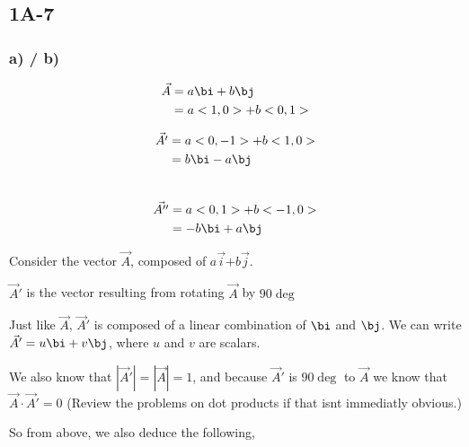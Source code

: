 \subsection*{1A-7}


\subsubsection*{a) / b)}

\begin{align*}
\vec{A} &= a\bi + b\bj\\
&= a<1,0> + b<0,1>\\
\end{align*}

\begin{align*}
\vec{A'} &= a<0,-1> + b <1,0>\\
&= b\bi -a\bj\\
\end{align*}\\

\begin{align*}
\vec{A''} &= a<0,1> + b <-1,0>\\
&= - b \bi + a\bj\\
\end{align*}



Consider the vector {\color{1}$\vec{A}$}, 
composed of {\color{2}$a\vec{i}$}$ + 
${\color{3}$b\vec{j}$}.

$\vec{A}'$ is the vector resulting from rotating {\color{1}$\vec{A}$} by $90\deg$


Just like $\vec{A}$, $\vec{A}'$ is composed of a linear combination 
of $\bi$ and $\bj$.
We can write $\vec{A}' = u\bi + v\bj$, where $u$ and $v$ are scalars.

We also know that $|\vec{A}'| = |\vec{A}| = 1$, and because $\vec{A}'
$ is $90\deg$ to $\vec{A}$ we know that $\vec{A} \cdot \vec{A}' = 0$ 
(Review the problems on dot products if that isnt immediatly obvious.)


So from above, we also deduce the following,

